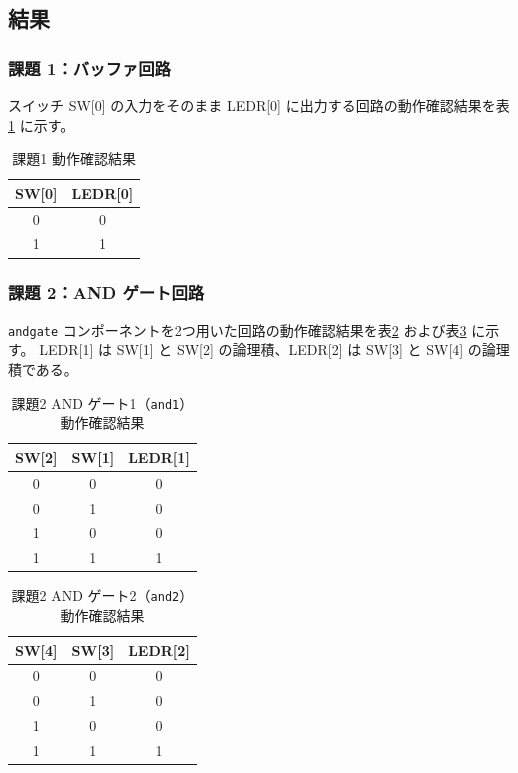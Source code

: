 \documentclass[12pt,a4paper]{ltjsarticle}
\begin{document}


\subsection{結果}\label{subsec:results}

\subsubsection{課題 1：バッファ回路}
スイッチ SW[0] の入力をそのまま LEDR[0] に出力する回路の動作確認結果を表\ref{tab:result-task1} に示す。

\begin{table}[H]
  \centering
  \caption{課題1 動作確認結果}
  \label{tab:result-task1}
  \begin{tabular}{cc}
    \toprule
    \textbf{SW{[0]}} & \textbf{LEDR{[0]}} \\
    \midrule
    0 & 0 \\
    1 & 1 \\
    \bottomrule
  \end{tabular}
\end{table}

\subsubsection{課題 2：AND ゲート回路}
\texttt{andgate} コンポーネントを2つ用いた回路の動作確認結果を表\ref{tab:result-task2-and1} および表\ref{tab:result-task2-and2} に示す。
LEDR[1] は SW[1] と SW[2] の論理積、LEDR[2] は SW[3] と SW[4] の論理積である。

\begin{table}[H]
  \centering
  \caption{課題2 AND ゲート1（\texttt{and1}）動作確認結果}
  \label{tab:result-task2-and1}
  \begin{tabular}{ccc}
    \toprule
    \textbf{SW{[2]}} & \textbf{SW{[1]}} & \textbf{LEDR{[1]}} \\
    \midrule
    0 & 0 & 0 \\
    0 & 1 & 0 \\
    1 & 0 & 0 \\
    1 & 1 & 1 \\
    \bottomrule
  \end{tabular}
\end{table}

\begin{table}[H]
  \centering
  \caption{課題2 AND ゲート2（\texttt{and2}）動作確認結果}
  \label{tab:result-task2-and2}
  \begin{tabular}{ccc}
    \toprule
    \textbf{SW{[4]}} & \textbf{SW{[3]}} & \textbf{LEDR{[2]}} \\
    \midrule
    0 & 0 & 0 \\
    0 & 1 & 0 \\
    1 & 0 & 0 \\
    1 & 1 & 1 \\
    \bottomrule
  \end{tabular}
\end{table}
\end{document}
